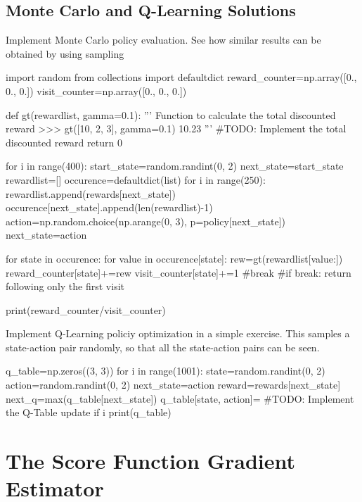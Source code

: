 \subsection{Monte Carlo and Q-Learning Solutions}
\begin{exercise}
Implement Monte Carlo policy evaluation. See how similar results can be
obtained by using sampling
\begin{python}
import random
from collections import defaultdict
reward_counter=np.array([0., 0., 0.])
visit_counter=np.array([0., 0., 0.])

def gt(rewardlist, gamma=0.1):
    '''
    Function to calculate the total discounted reward
    >>> gt([10, 2, 3], gamma=0.1)
    10.23
    '''
    #TODO: Implement the total discounted reward
    return 0

for i in range(400):
    start_state=random.randint(0, 2)
    next_state=start_state
    rewardlist=[]
    occurence=defaultdict(list) 
    for i in range(250):
        rewardlist.append(rewards[next_state]) 
        occurence[next_state].append(len(rewardlist)-1) 
        action=np.random.choice(np.arange(0, 3), p=policy[next_state]) 
        next_state=action

    for state in occurence: 
        for value in occurence[state]: 
            rew=gt(rewardlist[value:]) 
            reward_counter[state]+=rew 
            visit_counter[state]+=1 
            #break #if break: return following only the first visit

print(reward_counter/visit_counter)
\end{python}

Implement Q-Learning policiy optimization in a simple exercise. This samples a state-action pair randomly, so that all the state-action pairs can be seen.
\begin{python}
q_table=np.zeros((3, 3)) 
for i in range(1001): 
    state=random.randint(0, 2) 
    action=random.randint(0, 2) 
    next_state=action
    reward=rewards[next_state] 
    next_q=max(q_table[next_state]) 
    q_table[state, action]= #TODO: Implement the Q-Table update
    if i%
        print(q_table)
\end{python}
\end{exercise}

\section{The Score Function Gradient Estimator}

